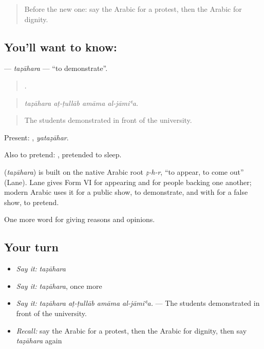 \begin{quote}
Before the new one: say the Arabic for a protest, then the Arabic for dignity.
\end{quote}

\subsection*{You'll want to know: }
\textbf{} — \emph{taẓāhara} — \textquotedblleft{}to demonstrate\textquotedblright{}.

\begin{quote}
   .
\end{quote}

\begin{quote}
\emph{taẓāhara aṭ-ṭullāb amāma al-jāmiʿa.}
\end{quote}

\begin{quote}
The students demonstrated in front of the university.
\end{quote}

Present: , \emph{yataẓāhar}.

Also to pretend:  , pretended to sleep.

\begin{cousinweb}
\textbf{} (\emph{taẓāhara}) is built on the native Arabic root \emph{ẓ-h-r}, \textquotedblleft{}to appear, to come out\textquotedblright{} (Lane). Lane gives Form VI for appearing and for people backing one another; modern Arabic uses it for a public show, to demonstrate, and with  for a false show, to pretend.
\end{cousinweb}

\begin{grammarlens}[title={What you've built}]
One more word for giving reasons and opinions.
\end{grammarlens}

\subsection*{Your turn}
\begin{itemize}
\raggedright
  \item \emph{Say it:} \emph{taẓāhara}
  \item \emph{Say it:} \emph{taẓāhara}, once more
  \item \emph{Say it:} \emph{taẓāhara aṭ-ṭullāb amāma al-jāmiʿa.} — The students demonstrated in front of the university.
  \item \emph{Recall:} say the Arabic for a protest, then the Arabic for dignity, then say \emph{taẓāhara} again
\end{itemize}

